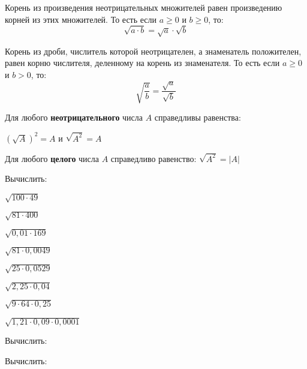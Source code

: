 %
%
\begin{class}[number=3]
	\begin{definit}
		Корень из произведения неотрицательных множителей равен произведению корней из этих множителей. То есть если \( a\ge0 \) и \( b\ge0 \), то: \[ \sqrt{a \cdot b}=\sqrt{a}\cdot\sqrt{b} \]
	\end{definit}
	\begin{definit}
		Корень из дроби,  числитель которой неотрицателен, а знаменатель положителен, равен корню числителя, деленному на корень из знаменателя. То есть если \( a\ge0 \) и \( b>0 \), то: \[ \sqrt{\dfrac{a}{b}}=\dfrac{\sqrt{a}}{\sqrt{b}} \]
	\end{definit}
	\begin{definit}
		Для любого \textbf{неотрицательного} числа \( A \) справедливы равенства:
		\begin{center}
			\( \left( \sqrt{A} \right)^2=A \) и \( \sqrt{A^2}=A \)
		\end{center}
	\end{definit}
	\begin{definit}
		Для любого \textbf{целого} числа \( A \) справедливо равенство: \( \sqrt{A^2}=|A| \)
	\end{definit}
	\begin{listofex}
		\item Вычислить:
		\begin{enumcols}[itemcolumns=3]
			\item \( \sqrt{100\cdot49} \)
			\item \( \sqrt{81\cdot400} \)
			\item \( \sqrt{0,01\cdot169} \)
			\item \( \sqrt{81\cdot0,0049} \)
			\item \( \sqrt{25\cdot0,0529} \)
			\item \( \sqrt{2,25\cdot0,04} \)
			\item \( \sqrt{9\cdot64\cdot0,25} \)
			\item \( \sqrt{1,21\cdot0,09\cdot0,0001} \)
		\end{enumcols}
		\item Вычислить:
		\begin{enumcols}[itemcolumns=3]
			\item {}
			\item {}
			\item {}
		\end{enumcols}
		\item Вычислить:

\end{listofex}
\end{class}
